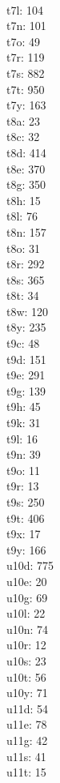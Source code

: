 \begin{multicols}{8}
  \\ t7l: 104
  \\ t7n: 101
  \\ t7o: 49
  \\ t7r: 119
  \\ t7s: 882
  \\ t7t: 950
  \\ t7y: 163
  \\ t8a: 23
  \\ t8c: 32
  \\ t8d: 414
  \\ t8e: 370
  \\ t8g: 350
  \\ t8h: 15
  \\ t8l: 76
  \\ t8n: 157
  \\ t8o: 31
  \\ t8r: 292
  \\ t8s: 365
  \\ t8t: 34
  \\ t8w: 120
  \\ t8y: 235
  \\ t9c: 48
  \\ t9d: 151
  \\ t9e: 291
  \\ t9g: 139
  \\ t9h: 45
  \\ t9k: 31
  \\ t9l: 16
  \\ t9n: 39
  \\ t9o: 11
  \\ t9r: 13
  \\ t9s: 250
  \\ t9t: 406
  \\ t9x: 17
  \\ t9y: 166
  \\ u10d: 775
  \\ u10e: 20
  \\ u10g: 69
  \\ u10l: 22
  \\ u10n: 74
  \\ u10r: 12
  \\ u10s: 23
  \\ u10t: 56
  \\ u10y: 71
  \\ u11d: 54
  \\ u11e: 78
  \\ u11g: 42
  \\ u11s: 41
  \\ u11t: 15

\end{multicols}
